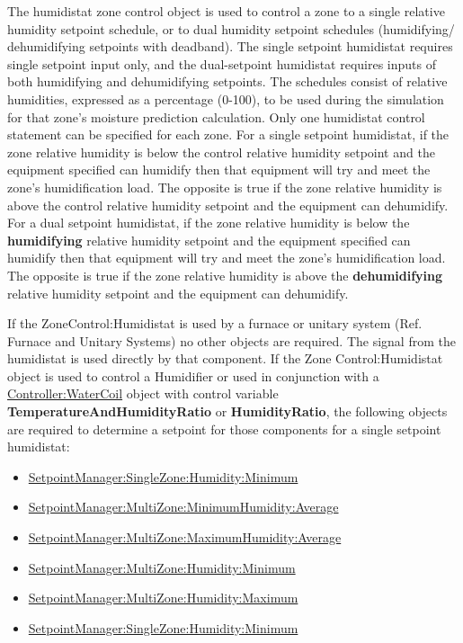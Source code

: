 The humidistat zone control object is used to control a zone to a single relative humidity setpoint schedule, or to dual humidity setpoint schedules (humidifying/ dehumidifying setpoints with deadband). The single setpoint humidistat requires single setpoint input only, and the dual-setpoint humidistat requires inputs of both humidifying and dehumidifying setpoints. The schedules consist of relative humidities, expressed as a percentage (0-100), to be used during the simulation for that zone's moisture prediction calculation. Only one humidistat control statement can be specified for each zone. For a single setpoint humidistat, if the zone relative humidity is below the control relative humidity setpoint and the equipment specified can humidify then that equipment will try and meet the zone's humidification load. The opposite is true if the zone relative humidity is above the control relative humidity setpoint and the equipment can dehumidify. For a dual setpoint humidistat, if the zone relative humidity is below the \textbf{humidifying} relative humidity setpoint and the equipment specified can humidify then that equipment will try and meet the zone's humidification load. The opposite is true if the zone relative humidity is above the \textbf{dehumidifying} relative humidity setpoint and the equipment can dehumidify.

If the ZoneControl:Humidistat is used by a furnace or unitary system (Ref. Furnace and Unitary Systems) no other objects are required. The signal from the humidistat is used directly by that component. If the Zone Control:Humidistat object is used to control a Humidifier or used in conjunction with a \hyperref[controllerwatercoil]{Controller:WaterCoil} object with control variable \textbf{TemperatureAndHumidityRatio} or \textbf{HumidityRatio}, the following objects are required to determine a setpoint for those components for a single setpoint humidistat:

\begin{itemize}
\item
  \hyperref[setpointmanagersinglezonehumidityminimum]{SetpointManager:SingleZone:Humidity:Minimum}
\item
  \hyperref[setpointmanagermultizoneminimumhumidityaverage]{SetpointManager:MultiZone:MinimumHumidity:Average}
\item
  \hyperref[setpointmanagermultizonemaximumhumidityaverage]{SetpointManager:MultiZone:MaximumHumidity:Average}
\item
  \hyperref[setpointmanagermultizonehumidityminimum]{SetpointManager:MultiZone:Humidity:Minimum}
\item
  \hyperref[setpointmanagermultizonehumiditymaximum]{SetpointManager:MultiZone:Humidity:Maximum}
\item
  \hyperref[setpointmanagersinglezonehumidityminimum]{SetpointManager:SingleZone:Humidity:Minimum}
\end{itemize}

